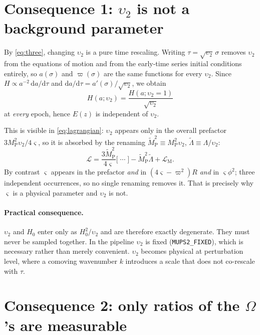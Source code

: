 \documentclass[11pt]{article}
\newcommand{\Mp}{M_{\mathrm{P}}}
\newcommand{\ups}{\upsilon_2}
\begin{document}
\section{Consequence 1: $\ups$ is not a background parameter}

By \eqref{eq:three}, changing $\ups$ is a pure time rescaling. Writing
$\tau=\sqrt{\ups}\,\sigma$ removes $\ups$ from the equations of motion and from
the early-time series initial conditions entirely, so $a(\sigma)$ and
$\varpi(\sigma)$ are the same functions for every $\ups$. Since
$H\propto a^{-2}\,\mathrm da/\mathrm d\tau$ and
$\mathrm da/\mathrm d\tau = a'(\sigma)/\sqrt{\ups}$, we obtain
\begin{equation}
H(a;\ups) = \frac{H(a;\ups{=}1)}{\sqrt{\ups}}
\end{equation}
at \emph{every} epoch, hence $E(z)$ is independent of $\ups$.

This is visible in \eqref{eq:lagrangian}: $\ups$ appears only in the overall
prefactor $3\Mp^2\ups/4\varsigma$, so it is absorbed by the renaming
$\widetilde\Mp^2\equiv\Mp^2\ups$, $\widetilde\Lambda\equiv\Lambda/\ups$:
\begin{equation}
\mathcal{L} = \frac{3\widetilde\Mp^2}{4\varsigma}\big[\;\cdots\;\big]
 - \widetilde\Mp^2\widetilde\Lambda + \mathcal{L}_{\mathrm M}.
\end{equation}
By contrast $\varsigma$ appears in the prefactor \emph{and} in
$(4\varsigma-\varpi^2)R$ \emph{and} in $\varsigma\phi^2$; three independent
occurrences, so no single renaming removes it. That is precisely why
$\varsigma$ is a physical parameter and $\ups$ is not.

\paragraph{Practical consequence.} $\ups$ and $H_0$ enter only as $H_0^2/\ups$
and are therefore exactly degenerate. They must never be sampled together. In
the pipeline $\ups$ is fixed (\texttt{MUPS2\_FIXED}), which is necessary rather
than merely convenient. $\ups$ becomes physical at perturbation level, where a
comoving wavenumber $k$ introduces a scale that does not co-rescale with $\tau$.

\section{Consequence 2: only ratios of the $\Omega$'s are measurable}
\end{document}
